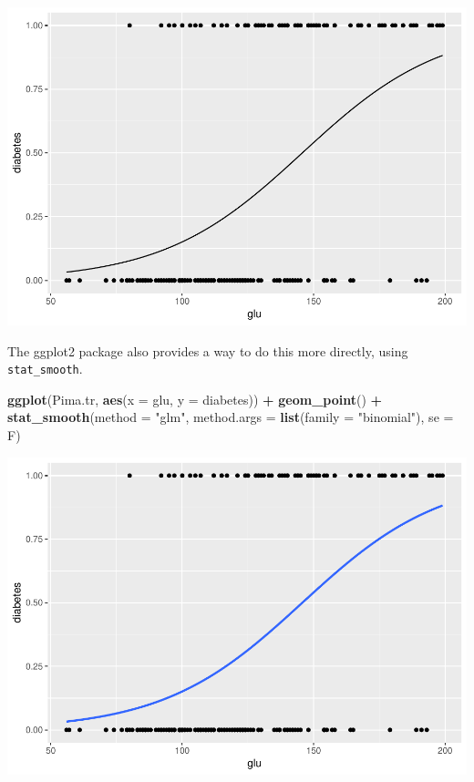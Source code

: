 \documentclass[]{article}
\newenvironment{Shaded}{\begin{snugshade}}{\end{snugshade}}
\newcommand{\KeywordTok}[1]{\textcolor[rgb]{0.13,0.29,0.53}{\textbf{#1}}}
\newcommand{\DataTypeTok}[1]{\textcolor[rgb]{0.13,0.29,0.53}{#1}}
\newcommand{\StringTok}[1]{\textcolor[rgb]{0.31,0.60,0.02}{#1}}
\newcommand{\OperatorTok}[1]{\textcolor[rgb]{0.81,0.36,0.00}{\textbf{#1}}}
\newcommand{\NormalTok}[1]{#1}
\begin{document}
\includegraphics{stt-301-programming_files/figure-latex/unnamed-chunk-162-1.pdf}

The ggplot2 package also provides a way to do this more directly, using
\texttt{stat\_smooth}.

\begin{Shaded}
\begin{Highlighting}[]
\KeywordTok{ggplot}\NormalTok{(Pima.tr, }\KeywordTok{aes}\NormalTok{(}\DataTypeTok{x =}\NormalTok{ glu, }\DataTypeTok{y =}\NormalTok{ diabetes)) }\OperatorTok{+}
\StringTok{    }\KeywordTok{geom_point}\NormalTok{() }\OperatorTok{+}
\StringTok{    }\KeywordTok{stat_smooth}\NormalTok{(}\DataTypeTok{method =} \StringTok{"glm"}\NormalTok{, }\DataTypeTok{method.args =} \KeywordTok{list}\NormalTok{(}\DataTypeTok{family =} \StringTok{"binomial"}\NormalTok{), }\DataTypeTok{se =}\NormalTok{ F)}
\end{Highlighting}
\end{Shaded}

\includegraphics{stt-301-programming_files/figure-latex/unnamed-chunk-163-1.pdf}
\end{document}
